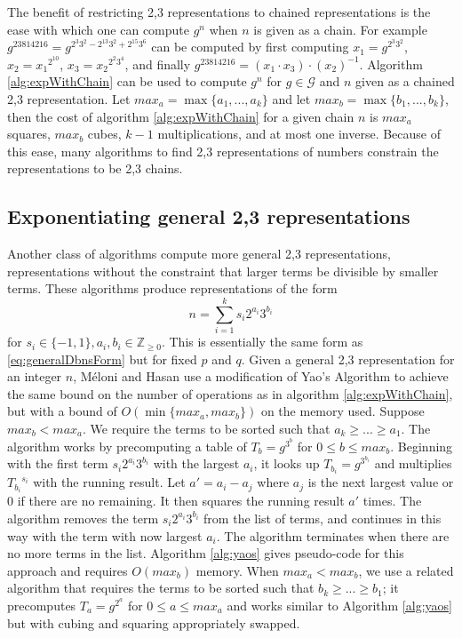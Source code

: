 \documentclass{ucalgthes1}
\theoremstyle{plain}
\theoremstyle{definition}
\newcommand{\ZZgez}{\mathbb{Z}_{\ge 0}}
\begin{document}
The benefit of restricting 2,3 representations to chained representations is the ease with which one can compute $g^n$ when $n$ is given as a chain.  For example $g^{23814216} = g^{2^3 3^2 - 2^{13} 3^2 + 2^{15} 3^6}$ can be computed by first computing $x_1 = g^{2^3 3^2}$, $x_2 = {x_1}^{2^{10}}$, $x_3 = {x_2}^{2^2 3^4}$, and finally $g^{23814216} = \left(x_1 \cdot x_3\right) \cdot \left(x_2\right)^{-1}$.  Algorithm \ref{alg:expWithChain} can be used to compute $g^n$ for $g \in \mathcal G$ and $n$ given as a chained 2,3 representation.  Let $max_a = \max \{a_1,...,a_k\}$ and let $max_b = \max \{b_1,...,b_k\}$, then the cost of algorithm \ref{alg:expWithChain} for a given chain $n$ is $max_a$ squares, $max_b$ cubes, $k-1$ multiplications, and at most one inverse. Because of this ease, many algorithms to find 2,3 representations of numbers constrain the representations to be 2,3 chains.


\bigbreak
\subsection{Exponentiating general 2,3 representations}

Another class of algorithms compute more general 2,3 representations, representations without the constraint that larger terms be divisible by smaller terms.  These algorithms produce representations of the form
\[
	n = \sum_{i=1}^k s_i 2^{a_i} 3^{b_i}
\]
for $s_i \in \{-1, 1\}, a_i, b_i \in \ZZgez$.  This is essentially the same form as \eqref{eq:generalDbnsForm} but for fixed $p$ and $q$.  Given a general 2,3 representation for an integer $n$, M\'{e}loni and Hasan use a modification of Yao's Algorithm \cite[Section 3.2]{Meloni2009} to achieve the same bound on the number of operations as in algorithm \ref{alg:expWithChain}, but with a bound of $O(\min \{max_a, max_b\})$ on the memory used.  Suppose $max_b < max_a$.  We require the terms to be sorted such that $a_k \ge ... \ge a_1$.  The algorithm works by precomputing a table of $T_b = g^{3^b}$ for $0 \le b \le max_b$.  Beginning with the first term $s_i2^{a_i}3^{b_i}$ with the largest $a_i$, it looks up $T_{b_i} = g^{3^{b_i}}$ and multiplies ${T_{b_i}}^{s_i}$ with the running result.  Let $a' = a_i - a_j$ where $a_j$ is the next largest value or 0 if there are no remaining.  It then squares the running result $a'$ times.  The algorithm removes the term $s_i2^{a_i}3^{b_i}$ from the list of terms, and continues in this way with the term with now largest $a_i$.  The algorithm terminates when there are no more terms in the list.  Algorithm  \ref{alg:yaos} gives pseudo-code for this approach and requires $O(max_b)$ memory.  When $max_a < max_b$, we use a related algorithm that requires the terms to be sorted such that $b_k \ge ... \ge b_1$; it precomputes $T_a = g^{2^a}$ for $0 \le a \le max_a$ and works similar to Algorithm \ref{alg:yaos} but with cubing and squaring appropriately swapped.
\end{document}
